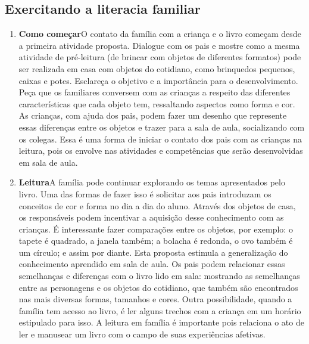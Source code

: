 \documentclass[11pt]{extarticle}
\begin{document}
\subsection{Exercitando a literacia familiar}


\begin{enumerate}
\item \textbf{Como começar}\quad O contato da família com a criança e o livro começam desde a primeira atividade proposta.
Dialogue com os pais e mostre como a mesma atividade de pré-leitura (de brincar com objetos de diferentes formatos) pode ser realizada em casa com objetos do cotidiano, como brinquedos pequenos, caixas e potes. Esclareça o objetivo e a importância para o desenvolvimento. 
Peça que os familiares conversem com as crianças a respeito das diferentes características que cada objeto tem, ressaltando aspectos como forma e cor.
As crianças, com ajuda dos pais, podem fazer um desenho que represente essas diferenças entre os objetos e trazer para a sala de aula, socializando com os colegas.
Essa é uma forma de iniciar o contato dos pais com as crianças na leitura, pois os envolve nas atividades e competências que serão desenvolvidas em sala de aula.

\item \textbf{Leitura}\quad A família pode continuar 
explorando os temas apresentados pelo livro. Uma das formas de fazer isso é solicitar aos pais introduzam os conceitos de cor e forma no dia a dia do aluno. Através dos objetos de casa, os responsáveis podem incentivar a aquisição desse conhecimento com as crianças.
É interessante fazer comparações entre os objetos, por exemplo: o tapete é quadrado, a janela também; a bolacha é redonda, o ovo também é um círculo; e assim por diante. Esta proposta estimula a generalização do conhecimento aprendido em sala de aula.
Os pais podem relacionar essas semelhanças e diferenças com o livro lido em sala: mostrando as semelhanças entre as personagens e os objetos do cotidiano, que também são encontrados nas mais diversas formas, tamanhos e cores.
Outra possibilidade, quando a família tem acesso ao livro, é ler alguns trechos com a criança em um horário estipulado para isso. A leitura em família é importante pois relaciona o ato de ler e manusear um livro com o campo de suas experiências afetivas.


\end{enumerate}
\end{document}
